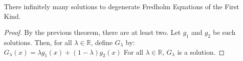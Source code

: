\documentclass[crop=false,class=book,oneside]{standalone}
\begin{document}
            \begin{theorem}
                There infinitely many solutions to degenerate
                Fredholm Equations of the First Kind.
            \end{theorem}
            \begin{proof}
                By the previous theorem, there are at least two. Let
                $g_{1}$ and $g_{2}$ be such solutions. Then, for all
                $\lambda\in\mathbb{R}$, define $G_{\lambda}$ by:
                $G_{\lambda}(x)=\lambda g_{1}(x)+(1-\lambda)g_{2}(x)$
                For all $\lambda\in\mathbb{R}$, $G_{\lambda}$ is a
                solution.
            \end{proof}
\end{document}
